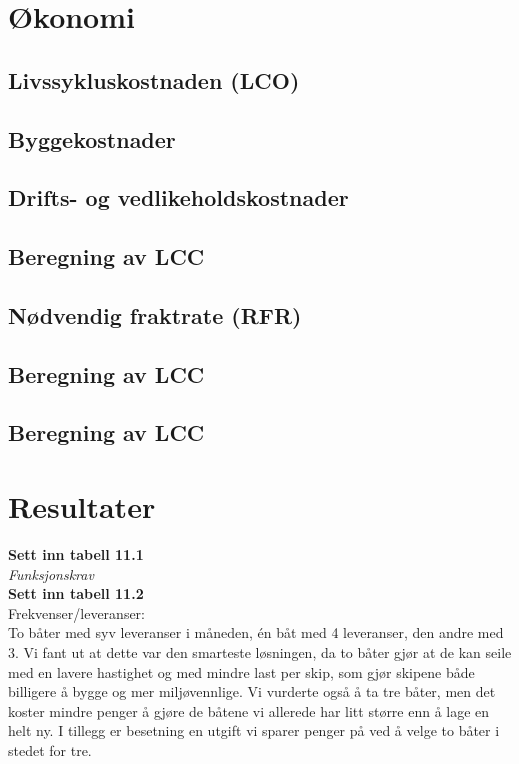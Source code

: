 \documentclass[norsk]{article}
\begin{document}
\section{Økonomi}
	\subsection{Livssykluskostnaden (LCO)}
	\subsection{Byggekostnader}
	\subsection{Drifts- og vedlikeholdskostnader}		
	\subsection{Beregning av LCC}
	\subsection{Nødvendig fraktrate (RFR)}		
	\subsection{Beregning av LCC}
	\subsection{Beregning av LCC}
  	
\section{Resultater}



\textbf{Sett inn tabell 11.1}\\

\textit{Funksjonskrav}\\

\textbf{Sett inn tabell 11.2}\\

Frekvenser/leveranser:\\

To båter med syv leveranser i måneden, én båt med 4 leveranser, den andre med 3. Vi fant ut at dette var den smarteste løsningen, da to båter gjør at de kan seile med en lavere hastighet og med mindre last per skip, som gjør skipene både billigere å bygge og mer miljøvennlige. Vi vurderte også å ta tre båter, men det koster mindre penger å gjøre de båtene vi allerede har litt større enn å lage en helt ny. I tillegg er besetning en utgift vi sparer penger på ved å velge to båter i stedet for tre. 
\end{document}
